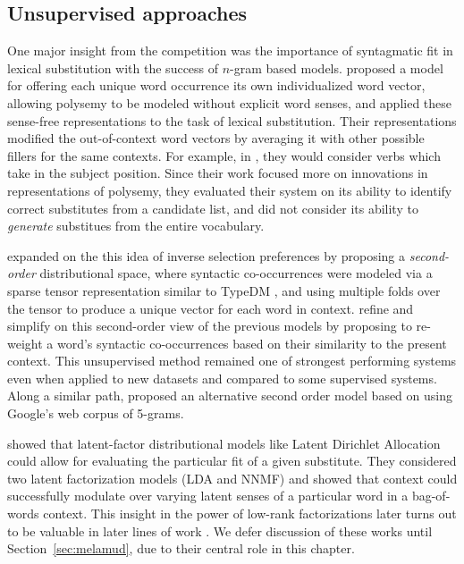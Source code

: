 \subsection{Unsupervised approaches}

One major insight from the competition was the importance of syntagmatic fit in
lexical substitution with the success of $n$-gram based models.
 proposed a model for offering each unique word
occurrence its own individualized word vector, allowing polysemy to be modeled
without explicit word senses, and applied these sense-free representations
to the task of lexical substitution. Their representations modified the
out-of-context word vectors by averaging it with other possible fillers for
the same contexts.
For example, in , they would consider
verbs which take  in the subject position. Since their
work focused more on innovations in representations of polysemy, they
evaluated their system on its ability to identify correct substitutes from
a candidate list, and did not consider its ability to {\em generate} substitues
from the entire vocabulary.

 expanded on the this idea of inverse
selection preferences by proposing a {\em second-order} distributional space,
where syntactic co-occurrences were modeled via a sparse tensor representation
similar to TypeDM \cite{baroni:2011:gems}, and using multiple folds over the
tensor to produce a unique vector for each word in context.
 refine and simplify on this second-order view of
the previous models by proposing to re-weight a word's syntactic co-occurrences
based on their similarity to the present context.
This unsupervised method remained one of strongest performing systems even when
applied to new datasets \cite{kremer:2014:eacl} and compared to some
supervised systems. Along a similar path,  proposed
an alternative second order model based on using Google's web corpus of
5-grams.

 showed that latent-factor distributional models like
Latent Dirichlet Allocation \cite{blei:2003:jmlr} could allow for evaluating
the particular fit of a given substitute. They considered two latent
factorization models (LDA and NNMF) and showed that context could successfully
modulate over varying latent senses of a particular word in a bag-of-words
context. This insight in the power of low-rank factorizations later turns
out to be valuable in later lines of work
\cite{melamud:2015:vsm,roller:2016:naacl}. We defer discussion of these works
until Section~\ref{sec:melamud}, due to their central role in this chapter.

